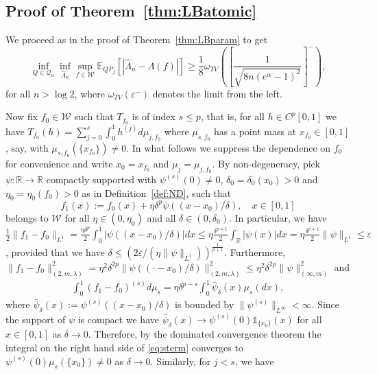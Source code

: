 \documentclass[preprint]{imsart}
\newcommand{\R}{{\mathbb R}}
\newcommand{\E}{{\mathbb E}}
\newcommand{\eps}{\varepsilon}
\numberwithin{equation}{section}
\begin{document}
\begin{appendix}
\subsection{Proof of Theorem~\ref{thm:LBatomic}}

We proceed as in the proof of Theorem~\ref{thm:LBparam} to get
\begin{equation}\label{eq:RohdeSteinb2}
\inf_{Q\in\mathcal Q_\alpha} \inf_{\hat{\Lambda}_n} \sup_{f\in\mathcal W} \E_{QP_f}\left[|\hat{\Lambda}_n - \Lambda(f)|\right]
\ge \frac18 \omega_{TV}\left(\left[\frac{1}{\sqrt{8n(e^\alpha-1)^2}}\right]^-\right),
\end{equation}
for all $n>\log 2$, where $\omega_{TV}(\eps^-)$ denotes the limit from the left. 


Now fix $f_0\in\mathcal W$ such that $T_{f_0}$ is of index $s\le p$, that is, for all $h\in C^p[0,1]$ we have $T_{f_0}(h) = \sum_{j=0}^s \int_0^1 h^{(j)} d\mu_{j,f_0}$ where $\mu_{s,f_0}$ has a point mass at $x_{f_0}\in[0,1]$, say, with $\mu_{s,f_0}(\{x_{f_0}\}) \neq 0$. In what follows we suppress the dependence on $f_0$ for convenience and write $x_0=x_{f_0}$ and $\mu_j = \mu_{j,f_0}$.
By non-degeneracy, pick $\psi:\R\to\R$ compactly supported with $\psi^{(s)}(0)\neq0$, $\delta_0 = \delta_0(x_0)>0$ and $\eta_0 = \eta_0(f_0)>0$ as in Definition~\ref{def:ND}, such that 
$$
    f_1(x) := f_0(x) + \eta\delta^p\psi((x-x_{0})/\delta), \quad x\in[0,1]
$$
belongs to $\mathcal W$ for all $\eta\in(0,\eta_0)$ and all $\delta\in(0,\delta_0)$.
In particular, we have $\frac12\|f_1-f_0\|_{L^1} = \frac{\eta\delta^p}{2}\int_0^1 |\psi((x-x_{0})/\delta)|dx \le \eta\frac{\delta^{p+1}}{2}\int_\R |\psi(x)|dx = \eta\frac{\delta^{p+1}}{2} \|\psi\|_{L^1} \le \eps$, provided that we have $\delta \le (2\eps/(\eta\|\psi\|_{L^1}))^{\frac{1}{p+1}}$. Furthermore, $\|f_1-f_0\|^2_{(2,m,\lambda)} = \eta^2\delta^{2p} \|\psi((\cdot-x_{0})/\delta)\|^2_{(2,m,\lambda)}\le \eta^2\delta^{2p}\|\psi\|^2_{(\infty,m)}$ and 
\begin{align}\label{eq:sterm}
    \int_0^1 (f_1-f_0)^{(s)}d\mu_{s} = \eta\delta^{p-s} \int_0^1 \bar{\psi}_\delta(x)\mu_{s}(dx),
\end{align} 
where $\bar{\psi}_\delta(x):= \psi^{(s)}((x-x_{0})/\delta)$ is bounded by $\|\psi^{(s)}\|_{L^\infty}<\infty$. Since the support of $\psi$ is compact we have $\bar{\psi}_\delta(x)\to \psi^{(s)}(0)\mathds 1_{\{x_0\}}(x)$ for all $x\in[0,1]$ as $\delta\to0$. Therefore, by the dominated convergence theorem the integral on the right hand side of \eqref{eq:sterm} converges to $\psi^{(s)}(0)\mu_s(\{x_0\})\neq0$ as $\delta\to0$. Similarly, for $j<s$, we have

\end{appendix}
\end{document}
